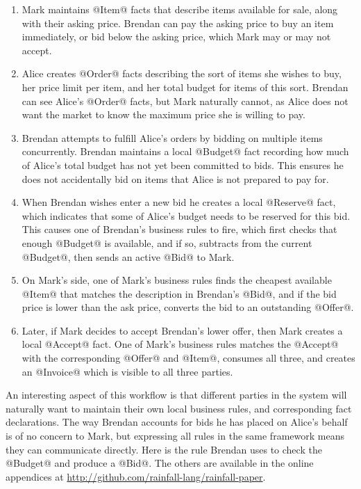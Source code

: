 \begin{enumerate}
\item Mark maintains @Item@ facts that describe items available for sale, along with their asking price. Brendan can pay the asking price to buy an item immediately, or bid below the asking price, which Mark may or may not accept.

\item Alice creates @Order@ facts describing the sort of items she wishes to buy, her price limit per item, and her total budget for items of this sort. Brendan can see Alice's @Order@ facts, but Mark naturally cannot, as Alice does not want the market to know the maximum price she is willing to pay.

\item Brendan attempts to fulfill Alice's orders by bidding on multiple items concurrently. Brendan maintains a local @Budget@ fact recording how much of Alice's total budget has not yet been committed to bids. This ensures he does not accidentally bid on items that Alice is not prepared to pay for.

\item When Brendan wishes enter a new bid he creates a local @Reserve@ fact, which indicates that some of Alice's budget needs to be reserved for this bid. This causes one of Brendan's business rules to fire, which first checks that enough @Budget@ is available, and if so, subtracts from the current @Budget@, then sends an active @Bid@ to Mark.

\item On Mark's side, one of Mark's business rules finds the cheapest available @Item@ that matches the description in Brendan's @Bid@, and if the bid price is lower than the ask price, converts the bid to an outstanding @Offer@.

\item Later, if Mark decides to accept Brendan's lower offer, then Mark creates a local @Accept@ fact. One of Mark's business rules matches the @Accept@ with the corresponding @Offer@ and @Item@, consumes all three, and creates an @Invoice@ which is visible to all three parties.
\end{enumerate}

An interesting aspect of this workflow is that different parties in the system will naturally want to maintain their own local business rules, and corresponding fact declarations. The way Brendan accounts for bids he has placed on Alice's behalf is of no concern to Mark, but expressing all rules in the same framework means they can communicate directly. Here is the rule Brendan uses to check the @Budget@ and produce a @Bid@. The others are available in the online appendices at
\url{http://github.com/rainfall-lang/rainfall-paper}.

